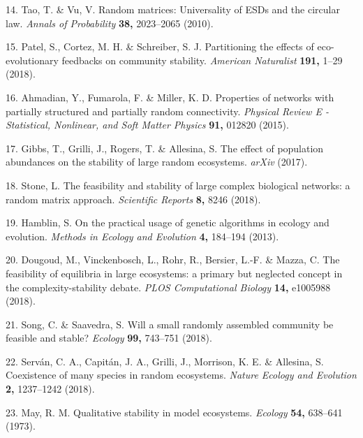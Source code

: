 \documentclass[]{article}
\begin{document}
\hypertarget{ref-Tao2010}{}
14. Tao, T. \& Vu, V. Random matrices: Universality of ESDs and the
circular law. \emph{Annals of Probability} \textbf{38,} 2023--2065
(2010).

\hypertarget{ref-Patel2018}{}
15. Patel, S., Cortez, M. H. \& Schreiber, S. J. Partitioning the
effects of eco-evolutionary feedbacks on community stability.
\emph{American Naturalist} \textbf{191,} 1--29 (2018).

\hypertarget{ref-Ahmadian2015}{}
16. Ahmadian, Y., Fumarola, F. \& Miller, K. D. Properties of networks
with partially structured and partially random connectivity.
\emph{Physical Review E - Statistical, Nonlinear, and Soft Matter
Physics} \textbf{91,} 012820 (2015).

\hypertarget{ref-Gibbs2017}{}
17. Gibbs, T., Grilli, J., Rogers, T. \& Allesina, S. The effect of
population abundances on the stability of large random ecosystems.
\emph{arXiv} (2017).

\hypertarget{ref-Stone2017}{}
18. Stone, L. The feasibility and stability of large complex biological
networks: a random matrix approach. \emph{Scientific Reports}
\textbf{8,} 8246 (2018).

\hypertarget{ref-Hamblin2013}{}
19. Hamblin, S. On the practical usage of genetic algorithms in ecology
and evolution. \emph{Methods in Ecology and Evolution} \textbf{4,}
184--194 (2013).

\hypertarget{ref-Dougoud2018}{}
20. Dougoud, M., Vinckenbosch, L., Rohr, R., Bersier, L.-F. \& Mazza, C.
The feasibility of equilibria in large ecosystems: a primary but
neglected concept in the complexity-stability debate. \emph{PLOS
Computational Biology} \textbf{14,} e1005988 (2018).

\hypertarget{ref-Song2018}{}
21. Song, C. \& Saavedra, S. Will a small randomly assembled community
be feasible and stable? \emph{Ecology} \textbf{99,} 743--751 (2018).

\hypertarget{ref-Servan2018}{}
22. Serván, C. A., Capitán, J. A., Grilli, J., Morrison, K. E. \&
Allesina, S. Coexistence of many species in random ecosystems.
\emph{Nature Ecology and Evolution} \textbf{2,} 1237--1242 (2018).

\hypertarget{ref-May1973}{}
23. May, R. M. Qualitative stability in model ecosystems. \emph{Ecology}
\textbf{54,} 638--641 (1973).

\clearpage
\end{document}
